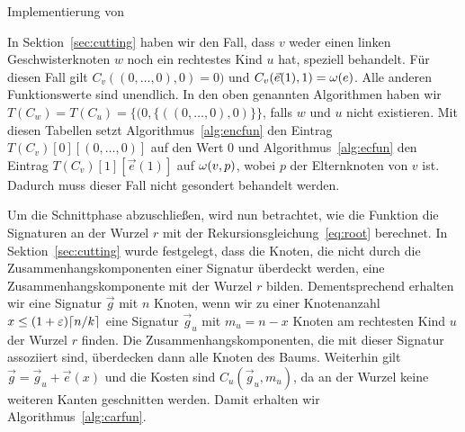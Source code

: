 \begin{algorithm}
    \caption{Implementierung von }\label{alg:ecfun}
    \begin{algorithmic}[1]
             
                \Return
            \Else
            \EndIf
        \EndFunction
    \end{algorithmic}
\end{algorithm}

\begin{rem}
    In Sektion~\ref{sec:cutting} haben wir den Fall, dass $v$ weder einen linken Geschwisterknoten $w$ noch ein rechtestes Kind $u$ hat, speziell behandelt.
    Für diesen Fall gilt $C_v((0,\ldots,0), 0) = 0)$ und $C_v(\vec{e}(1), 1) = \omega(e)$. 
    Alle anderen Funktionswerte sind unendlich.
    In den oben genannten Algorithmen haben wir $T(C_w) = T(C_u) = \{(0, \{((0, \ldots, 0), 0)\} \}$, falls $w$ und $u$ nicht existieren.
    Mit diesen Tabellen setzt Algorithmus~\ref{alg:encfun} den Eintrag $T(C_v)[0][(0,\ldots, 0)]$ auf den Wert $0$ und Algorithmus~\ref{alg:ecfun} den Eintrag $T(C_v)[1][\vec{e}(1)]$ auf $\omega(v,p)$, wobei $p$ der Elternknoten von $v$ ist.
    Dadurch muss dieser Fall nicht gesondert behandelt werden.
\end{rem}

Um die Schnittphase abzuschließen, wird nun betrachtet, wie die Funktion \mbox{\carfun{}} die Signaturen an der Wurzel $r$ mit der Rekursionsgleichung~\eqref{eq:root} berechnet.
In Sektion~\ref{sec:cutting} wurde festgelegt, dass die Knoten, die nicht durch die Zusammenhangskomponenten einer Signatur überdeckt werden, eine Zusammenhangskomponente mit der Wurzel $r$ bilden.
Dementsprechend erhalten wir eine Signatur $\vec{g}$ mit $n$ Knoten, wenn wir zu einer Knotenanzahl $x \leq (1+\varepsilon)\lceil n/k\rceil$ eine Signatur $\vec{g}_u$ mit $m_u = n - x$ Knoten am rechtesten Kind $u$ der Wurzel $r$ finden.
Die Zusammenhangskomponenten, die mit dieser Signatur assoziiert sind, überdecken dann alle Knoten des Baums.
Weiterhin gilt $\vec{g} = \vec{g}_u + \vec{e}(x)$ und die Kosten sind $C_u(\vec{g}_u, m_u)$, da an der Wurzel keine weiteren Kanten geschnitten werden.
Damit erhalten wir Algorithmus~\ref{alg:carfun}.

